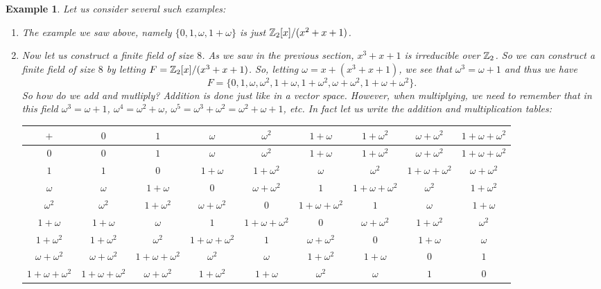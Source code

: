 \documentclass[12pt]{article}
\theoremstyle{plain}
\newtheorem{example}{Example}
\theoremstyle{definition}
\theoremstyle{remark}
\begin{document}
\begin{example}
Let us consider several such examples:
\begin{enumerate}
    \item The example we saw above, namely $\{0,1,\omega, 1+\omega\}$ is just $\mathbb{Z}_2[x]/(x^2+x+1)$.
    \item Now let us construct a finite field of size $8$. As we saw in the previous section, $x^3+x+1$ is irreducible over $\mathbb{Z}_2$. So we can construct a finite field of size $8$ by letting $F= \mathbb{Z}_2[x]/(x^3+x+1)$.
    So, letting $\omega = x+(x^3+x+1)$, we see that $\omega^3=\omega+1$ and thus we have
    $$F = \{0,1, \omega, \omega ^2, 1+\omega, 1+\omega^2, \omega+\omega^2, 1+\omega+\omega^2\}.$$ So how do we add and mutliply? Addition is done just like in a vector space. However, when multiplying, we need to remember that in this field $\omega^3=\omega+1$, $\omega^4=\omega^2+\omega$, $\omega^5 = \omega^3+\omega^2= \omega^2+\omega+1$, etc.  In fact let us write the addition and multiplication tables:


\begin{table}[H]
\footnotesize{
\begin{tabular}{ c| c | c |c|c|c|c|c|c}
$+$  & $0$ & $1$ & $\omega$ & $\omega^2$ & $1+\omega$ & $1+\omega^2$ & $\omega+\omega^2$ & $1+\omega+\omega^2$ \\
\hline
$0$ &$0$ & $1$ & $\omega$ & $\omega^2$ & $1+\omega$ & $1+\omega^2$ & $\omega+\omega^2$ & $1+\omega+\omega^2$   \\
\hline
$1$ & $1$ & $0$ & $1+\omega$ & $1+\omega^2$ & $\omega$ & $\omega^2$ & $1+\omega+\omega^2$ & $\omega+\omega^2$  \\
\hline
$\omega$ & $\omega$ & $1+\omega$ & $0$ & $\omega+\omega^2$  & $1$ & $1+\omega+\omega^2$ & $\omega^2$ & $1+\omega^2$\\
\hline
$\omega^2$ & $\omega^2$& $1+\omega^2$ & $\omega+\omega^2$&$0$ & $1+\omega+\omega^2$ &$1$& $\omega$ & $ 1+\omega$\\
\hline
$1+\omega$ & $1+\omega$& $\omega$ & $1$&$1+\omega+\omega^2$ & $0$ &$\omega+\omega^2$& $1+\omega^2$ & $\omega^2$\\
\hline
$1+\omega^2$ & $1+\omega^2$& $\omega^2$&$1+\omega+\omega^2$ & $1$&$\omega+\omega^2$ &$0$& $1+\omega$ & $\omega$\\
\hline
$\omega+\omega^2$ & $\omega+\omega^2$&$1+\omega+\omega^2$& $\omega^2$&$\omega$ & $1+\omega^2$&$1+\omega$ &$0$& $1$\\
\hline
$1+\omega+\omega^2$ & $1+\omega+\omega^2$&$\omega+\omega^2$& $1+\omega^2$&$1+\omega$ & $\omega^2$&$\omega$ &$1$& $0$\\


\end{tabular}}
\end{table}
\end{enumerate}
\end{example}
\end{document}

